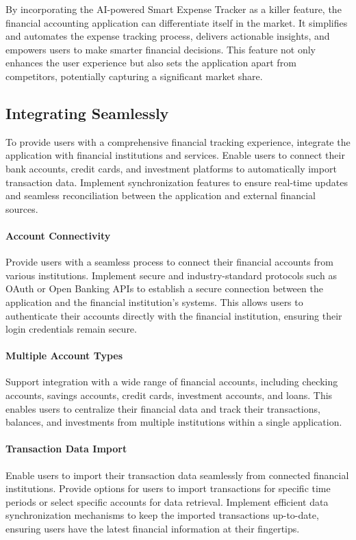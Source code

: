 By incorporating the AI-powered Smart Expense Tracker as a killer feature, the financial accounting application 
can differentiate itself in the market. It simplifies and automates the expense tracking process, delivers actionable 
insights, and empowers users to make smarter financial decisions. This feature not only enhances the user experience 
but also sets the application apart from competitors, potentially capturing a significant market share.


\subsection{Integrating Seamlessly}

To provide users with a comprehensive financial tracking experience, integrate the application with financial 
institutions and services. Enable users to connect their bank accounts, credit cards, and investment platforms 
to automatically import transaction data. Implement synchronization features to ensure real-time updates and 
seamless reconciliation between the application and external financial sources.

\paragraph{Account Connectivity}
Provide users with a seamless process to connect their financial accounts from various institutions. 
Implement secure and industry-standard protocols such as OAuth or Open Banking APIs to establish a secure connection 
between the application and the financial institution's systems. This allows users to authenticate their accounts 
directly with the financial institution, ensuring their login credentials remain secure.

\paragraph{Multiple Account Types}
Support integration with a wide range of financial accounts, including checking accounts, 
savings accounts, credit cards, investment accounts, and loans. This enables users to centralize their financial 
data and track their transactions, balances, and investments from multiple institutions within a single application.

\paragraph{Transaction Data Import}
Enable users to import their transaction data seamlessly from connected financial institutions. 
Provide options for users to import transactions for specific time periods or select specific accounts for data 
retrieval. Implement efficient data synchronization mechanisms to keep the imported transactions up-to-date, 
ensuring users have the latest financial information at their fingertips.

